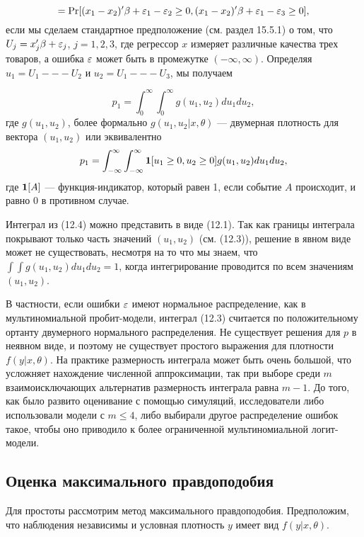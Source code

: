 \[
=\mathrm{Pr}[(x_1-x_2)' \beta+\varepsilon_1-\varepsilon_2 \geq  0, (x_1-x_2)' \beta+\varepsilon_1-\varepsilon_3 \geq  0],
\]
если мы сделаем стандартное предположение (см. раздел 15.5.1) о том, что $U_j = x_j'\beta + \varepsilon_j$, $j = 1, 2, 3$, где регрессор $x$ измеряет различные качества трех товаров, а ошибка $\varepsilon$ может быть в промежутке $(-\infty, \infty)$. Определяя $u_1 = U_1 --- U_2$ и $u_2= U_1 --- U_3$,  мы получаем
 
\begin{equation}
p_1=\int^{\infty}_{0}\int^{\infty}_{0}g(u_1,u_2)du_1 du_2,
\end{equation}
где $g(u_1, u_2)$, более формально $g(u_1, u_2| x, \theta)$ --- двумерная плотность для вектора $(u_1, u_2)$ или эквивалентно
\begin{equation}
p_1=\int^{\infty}_{-\infty}\int^{\infty}_{-\infty}{\bf{1}}[u_1 \geq  0,u_2 \geq  0]g(u_1,u_2)du_1 du_2,
\end{equation}
где ${\bf{1}}[A]$ --- функция-индикатор, который равен 1, если событие $A$ происходит, и равно 0 в противном случае.

Интеграл из (12.4) можно представить в виде (12.1). Так как границы интеграла покрывают только часть значений $(u_1, u_2)$ (см. (12.3)), решение в явном виде может не существовать, несмотря на то что мы знаем, что $\int \int g(u_1, u_2)du_1du_2 = 1$, когда интегрирование проводится по всем значениям $(u_1, u_2)$.

В частности, если ошибки $\varepsilon$ имеют нормальное распределение, как в мультиномиальной пробит-модели, интеграл (12.3) считается по положительному ортанту двумерного нормального распределения. 
Не существует решения для $p$ в неявном виде, и поэтому не существует простого выражения для плотности $f(y|x,\theta)$. На практике размерность интеграла может быть очень большой, что усложняет нахождение численной аппроксимации, так при выборе  среди $m$  взаимоисключающих альтернатив размерность интеграла равна $m-1$. До того, как было развито оценивание с помощью симуляций, исследователи либо использовали модели с $m \leq 4$, либо выбирали другое распределение ошибок такое, чтобы оно приводило к более ограниченной мультиномиальной логит-модели.

\subsection{Оценка максимального правдоподобия}

Для простоты рассмотрим метод максимального правдоподобия. Предположим, что наблюдения независимы и условная плотность $y$ имеет вид $f(y|x,\theta)$.

